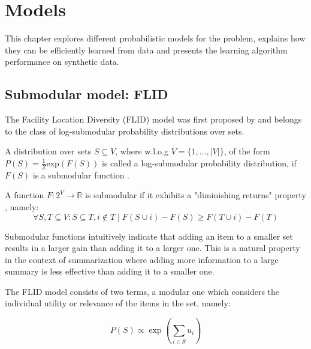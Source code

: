 \chapter{Models}
\label{sec:models}

This chapter explores different probabilistic models for the problem, explains how they can be efficiently learned from data and presents the learning algorithm performance on synthetic data.

\section{Submodular model: FLID}

The Facility Location Diversity (FLID) model was first proposed by \citet{tschiatschek16learning} and belongs to the class of log-submodular probability distributions over sets.

\begin{definition}
  A distribution over sets $S \subseteq V$, where w.l.o.g $V = \{1,\dots,|V|\}$, of the form $P(S) = \frac{1}{Z}\mathrm{exp}(F(S))$ is called a log-submodular probability distribution, if $F(S)$ is a submodular function \citep{djolonga14variational}.
\end{definition}

\begin{definition}
  \label{def:submodularity}
  A function $F:2^V \rightarrow \mathbb{R}$ is submodular if it exhibits a "diminishing returns" property \citep{krause14submodular}, namely:
    \begin{equation*}
      \forall S,T \subseteq V : S \subseteq T, i \notin T \mid F(S \cup i) - F(S) \geq F(T \cup i) - F(T)
    \end{equation*}
\end{definition}

Submodular functions intuitively indicate that adding an item to a smaller set results in a larger gain than adding it to a larger one. This is a natural property in the context of summarization where adding more information to a large summary is less effective than adding it to a smaller one.

The FLID model consists of two terms, a modular one which considers the individual utility or relevance of the items in the set, namely:

\begin{equation}
  \label{eq:modular}
  P(S) \propto \exp\left(\sum_{i \in S}u_{i}\right)
\end{equation}

